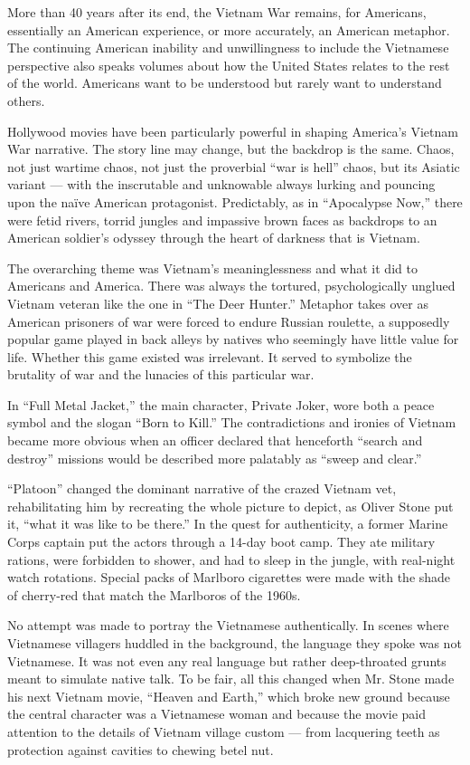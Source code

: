 More than 40 years after its end, the Vietnam War remains, for
Americans, essentially an American experience, or more accurately, an
American metaphor. The continuing American inability and unwillingness
to include the Vietnamese perspective also speaks volumes about how the
United States relates to the rest of the world. Americans want to be
understood but rarely want to understand others.

Hollywood movies have been particularly powerful in shaping America's
Vietnam War narrative. The story line may change, but the backdrop is
the same. Chaos, not just wartime chaos, not just the proverbial ``war
is hell'' chaos, but its Asiatic variant --- with the inscrutable and
unknowable always lurking and pouncing upon the naïve American
protagonist. Predictably, as in ``Apocalypse Now,'' there were fetid
rivers, torrid jungles and impassive brown faces as backdrops to an
American soldier's odyssey through the heart of darkness that is
Vietnam.

The overarching theme was Vietnam's meaninglessness and what it did to
Americans and America. There was always the tortured, psychologically
unglued Vietnam veteran like the one in ``The Deer Hunter.'' Metaphor
takes over as American prisoners of war were forced to endure Russian
roulette, a supposedly popular game played in back alleys by natives who
seemingly have little value for life. Whether this game existed was
irrelevant. It served to symbolize the brutality of war and the lunacies
of this particular war.

In ``Full Metal Jacket,'' the main character, Private Joker, wore both a
peace symbol and the slogan ``Born to Kill.'' The contradictions and
ironies of Vietnam became more obvious when an officer declared that
henceforth ``search and destroy'' missions would be described more
palatably as ``sweep and clear.''

``Platoon'' changed the dominant narrative of the crazed Vietnam vet,
rehabilitating him by recreating the whole picture to depict, as Oliver
Stone put it, ``what it was like to be there.'' In the quest for
authenticity, a former Marine Corps captain put the actors through a
14-day boot camp. They ate military rations, were forbidden to shower,
and had to sleep in the jungle, with real-night watch rotations. Special
packs of Marlboro cigarettes were made with the shade of cherry-red that
match the Marlboros of the 1960s.

No attempt was made to portray the Vietnamese authentically. In scenes
where Vietnamese villagers huddled in the background, the language they
spoke was not Vietnamese. It was not even any real language but rather
deep-throated grunts meant to simulate native talk. To be fair, all this
changed when Mr. Stone made his next Vietnam movie, ``Heaven and
Earth,'' which broke new ground because the central character was a
Vietnamese woman and because the movie paid attention to the details of
Vietnam village custom --- from lacquering teeth as protection against
cavities to chewing betel nut.

